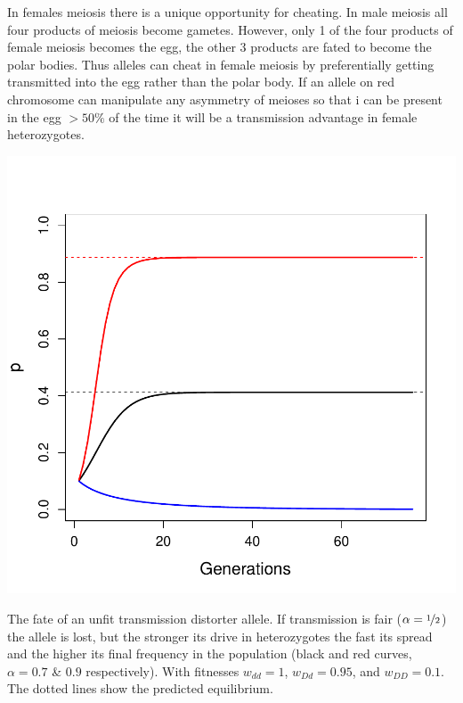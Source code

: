{%

In females meiosis there is a unique opportunity for cheating. In male
meiosis all four products of meiosis become gametes. 
However, only 1 of the four products of female meiosis becomes the egg, the other 3 products
are fated to become the polar bodies. Thus alleles can cheat in female meiosis by preferentially getting
transmitted into the egg rather than the polar body. If an allele on
red chromosome can manipulate any asymmetry of meioses so that i can be
present in the egg $>50\%$ of the time it will be a transmission
advantage in female heterozygotes. 

 \begin{marginfigure}
\begin{center}
\includegraphics[width= \textwidth]{figures/autosomal_driver.pdf}
\end{center}
\caption{
The fate of an unfit transmission distorter allele. If transmission is
fair ($\alpha =\nicefrac
{1}{2}$) the allele is lost, but the stronger its drive in
heterozygotes the fast its spread and the higher its final frequency
in the population (black and red curves, $\alpha =0.7$ \& $0.9$
respectively).  With fitnesses $w_{dd}=1$,
$w_{Dd}=0.95$, and $ w_{DD}=0.1$. The dotted lines show the predicted
equilibrium. 
} \label{fig:autosomal_driver}
\end{marginfigure} 


}
